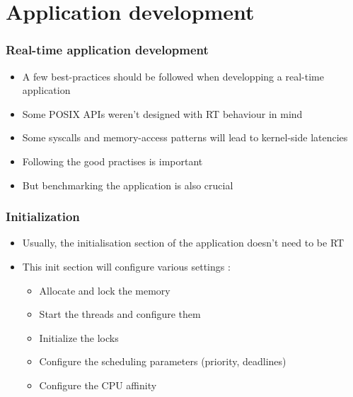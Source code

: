 \section{Application development}

\begin{frame}
\frametitle{Real-time application development}
	\begin{itemize}
		\item A few best-practices should be followed when developping a real-time application
		\item Some POSIX APIs weren't designed with RT behaviour in mind
		\item Some syscalls and memory-access patterns will lead to kernel-side latencies
		\item Following the good practises is important
		\item But benchmarking the application is also crucial
	\end{itemize}
\end{frame}

\begin{frame}
	\frametitle{Initialization}
	\begin{itemize}
		\item Usually, the initialisation section of the application doesn't need to be RT
		\item This init section will configure various settings :
			\begin{itemize}
				\item Allocate and lock the memory
				\item Start the threads and configure them
				\item Initialize the locks
				\item Configure the scheduling parameters (priority, deadlines)
				\item Configure the CPU affinity
			\end{itemize}

	\end{itemize}
\end{frame}

